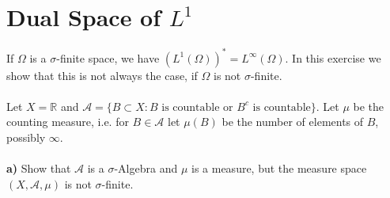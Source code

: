 \documentclass[12pt,a4paper]{article}
\author{Marco Bertenghi}
\begin{document}
\section{Dual Space of $L^1$}
If $\Omega$ is a $\sigma$-finite space, we have $(L^1( \Omega))^* = L^\infty( \Omega)$. In this exercise we show that this is not always the case, if $\Omega$ is not $\sigma$-finite. 
\\\\
Let $X = \mathbb{R}$ and $\mathcal{A}= \lbrace B \subset X : B \text{ is countable or $B^c$ is countable} \rbrace$. Let $\mu$ be the counting measure, i.e. for $B \in \mathcal{A}$ let $\mu(B)$ be the number of elements of $B$, possibly $\infty$. 
\\\\
\textbf{a)} Show that $\mathcal{A}$ is a $\sigma$-Algebra and $\mu$ is a measure, but the measure space $(X, \mathcal{A}, \mu)$ is not $\sigma$-finite. 
\end{document}
